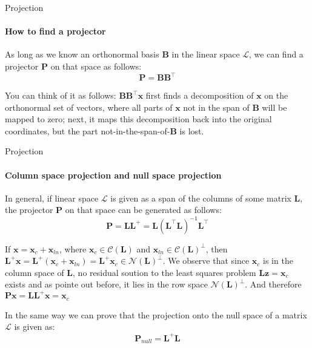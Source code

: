 \documentclass{beamer}
\begin{document}
\begin{frame}{Projection}
\framesubtitle{How to find a projector}
\begin{flushleft}

As long as we know an orthonormal basis $\mathbf{B}$ in the linear space $\mathcal{L}$, we can find a projector $\mathbf{P}$ on that space as follows:
%
\begin{equation}
    \mathbf{P} = \mathbf{B} \mathbf{B}^\top
\end{equation}

You can think of it as follows: $\mathbf{B} \mathbf{B}^\top \mathbf{x}$ first finds a decomposition of $\mathbf{x}$ on the orthonormal set of vectors, where all parts of $\mathbf{x}$ not in the span of $\mathbf{B}$ will be mapped to zero; next, it maps this decomposition back into the original coordinates, but the part not-in-the-span-of-$\mathbf{B}$ is lost.


\end{flushleft}
\end{frame}




\begin{frame}{Projection}
\framesubtitle{Column space projection and null space projection}
\begin{flushleft}


In general, if linear space $\mathcal{L}$ is given as a span of the columns of some matrix $\mathbf{L}$, the projector $\mathbf{P}$ on that space can be generated as follows:
%
\begin{equation}
    \mathbf{P} = \mathbf{L} \mathbf{L}^+ = \mathbf{L} (\mathbf{L}^\top \mathbf{L})^{-1} \mathbf{L}^\top
\end{equation}

If $\mathbf{x}  = \mathbf{x}_c + \mathbf{x}_{ln}$, where $\mathbf{x}_c \in \mathcal{C}(\mathbf{L})$ and $\mathbf{x}_{ln} \in \mathcal{C}(\mathbf{L})^\perp$, then $\mathbf{L}^+ \mathbf{x} = \mathbf{L}^+ (\mathbf{x}_c + \mathbf{x}_{ln}) = \mathbf{L}^+\mathbf{x}_c \in \mathcal{N}(\mathbf{L})^\perp$. We observe that since $\mathbf{x}_c$ is in the column space of $\mathbf{L}$, no residual soution to the least squares problem $\mathbf{L}\mathbf{z} = \mathbf{x}_c$ exists and as pointe out before, it lies in the row space $\mathcal{N}(\mathbf{L})^\perp$. And therefore $\mathbf{P}\mathbf{x} = \mathbf{L} \mathbf{L}^+\mathbf{x} = \mathbf{x}_c$

\bigskip

In the same way we can prove that the projection onto the null space of a matrix $\mathcal{L}$ is given as:
%
\begin{equation}
    \mathbf{P}_{null} = \mathbf{L}^+ \mathbf{L}
\end{equation}


\end{flushleft}
\end{frame}
\end{document}
